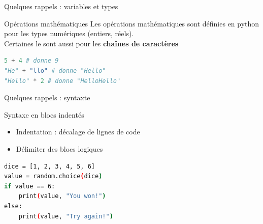     \begin{frame}[fragile]{Quelques rappels : variables et types}
        \begin{block}{Opérations mathématiques}
        \medskip
        Les opérations mathématiques sont définies en python pour les types numériques (entiers, réels).\\
        Certaines le sont aussi pour les \textbf{chaînes de caractères}
        \end{block}
        
\begin{lstlisting}[language=Python, morekeywords={as}, numbers=none]
5 + 4 # donne 9
"He" + "llo" # donne "Hello"
"Hello" * 2 # donne "HelloHello"
\end{lstlisting}
    \end{frame}
  
  \begin{frame}[fragile]{Quelques rappels : syntaxte}
  
    \begin{block}{Syntaxe en blocs indentés}
        \begin{itemize}
        \item Indentation : décalage de lignes de code
        \item Délimiter des blocs logiques
        \end{itemize}
    \end{block}
  
    \bigskip

\begin{lstlisting}[language=bash, morekeywords={def, list}, numbers=none]
dice = [1, 2, 3, 4, 5, 6]
value = random.choice(dice)
if value == 6:
    print(value, "You won!")
else:
    print(value, "Try again!")
\end{lstlisting}

\end{frame}










